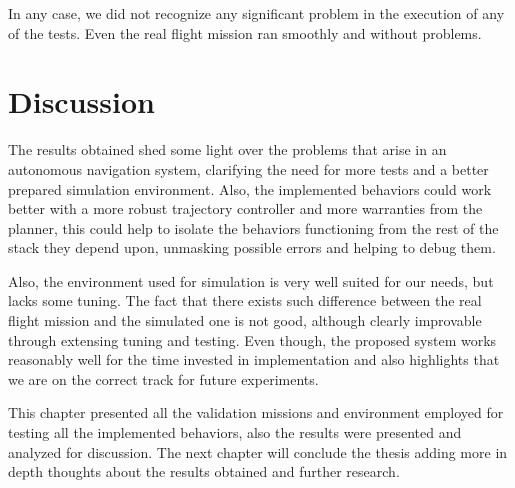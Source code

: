   In any case, we did not recognize any significant problem in the execution of any of the tests. Even the real flight mission ran smoothly and without problems.

\section{Discussion} \label{ch_5:sect:discussion}

  The results obtained shed some light over the problems that arise in an autonomous navigation system, clarifying the need for more tests and a better prepared simulation environment. Also, the implemented behaviors could work better with a more robust trajectory controller and more warranties from the planner, this could help to isolate the behaviors functioning from the rest of the stack they depend upon, unmasking possible errors and helping to debug them.

  Also, the environment used for simulation is very well suited for our needs, but lacks some tuning. The fact that there exists such difference between  the real flight mission and the simulated one is not good, although clearly improvable through extensing tuning and testing. Even though, the proposed system works reasonably well for the time invested in implementation and also highlights that we are on the correct track for future experiments.

This chapter presented all the validation missions and environment employed for testing all the implemented behaviors, also the results were presented and analyzed for discussion. The next chapter will conclude the thesis adding more in depth thoughts about the results obtained and further research.
